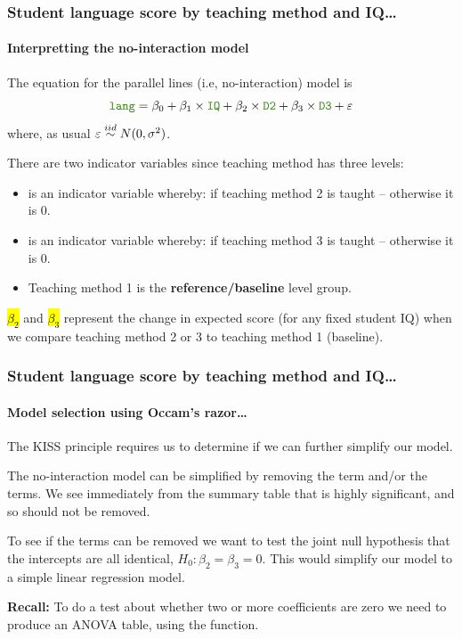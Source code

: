 \documentclass{beamer}\usepackage[]{graphicx}\usepackage[]{xcolor}
\begin{document}
\begin{frame}[fragile]
\frametitle{Student language score by teaching method and IQ\ldots}
\framesubtitle{Interpretting the no-interaction model}
The equation for the parallel lines (i.e, no-interaction) model is
\[
\rcode{lang}=\beta_0+\beta_1 \times \rcode{IQ}+\beta_{2} \times \rcode{D2} +\beta_{3} \times \rcode{D3} +\varepsilon
\]
where, as usual $\varepsilon \stackrel{iid}{\sim} N(0, \sigma^2)$.

There are two indicator variables since teaching method has three levels:
\begin{itemize}
\item {} is an indicator variable whereby:  if teaching method 2 is taught -- otherwise it is 0.
\item {} is an indicator variable whereby:  if teaching method 3 is taught -- otherwise it is 0.
\item Teaching method 1 is the \textbf{reference/baseline} level group. 
\end{itemize}
\medskip 

\hl{$\beta_{2}$} and \hl{$\beta_{3}$} represent the change in expected score 
(for any fixed student IQ)
when we compare teaching method 2 or 3 to teaching method 1 (baseline).
\end{frame}



\begin{frame}[fragile] 
\frametitle{Student language score by  teaching method and IQ\ldots}
\framesubtitle{Model selection using Occam's razor\ldots}
The KISS principle requires us to determine if we can further simplify our model. 
\medskip

The no-interaction model can be simplified by removing the  term and/or the  terms. We see immediately from the summary table that  is highly significant, and so should not be removed.
\medskip

To see if the  terms can be removed we want to test the joint null hypothesis that the intercepts are all identical, $H_0: \beta_2=\beta_3=0$.
This would simplify our model to a simple linear regression model.
\bigskip

\textbf{Recall:} 
To do a test about whether two or more coefficients are zero we need to produce an 
ANOVA table, using the  function.
\vfill
\end{frame}
\end{document}
